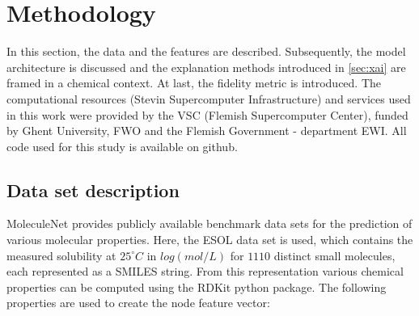 \chapter{Methodology}


In this section, the data and the features are described. 
Subsequently, the model architecture is discussed and the explanation methods 
introduced in \cref{sec:xai} are framed in a chemical context. At last, 
the fidelity metric is introduced. The computational resources (Stevin Supercomputer 
Infrastructure) and services used in this work were provided by the VSC (Flemish 
Supercomputer Center), funded by Ghent University, FWO and the Flemish Government 
- department EWI. All code used for this study is available on github\cite{gitrepo}.


\section{Data set description}


MoleculeNet provides publicly available benchmark data sets for the prediction of 
various molecular properties.\cite{wu2018moleculenet} Here, the ESOL data set is used,
which contains the measured solubility at $25^{\circ} C$ in $log(mol/L)$ for $1110$ 
distinct small molecules, each represented as a SMILES string.\cite{delaney2004esol}
From this representation various chemical properties can be computed using the RDKit python package\cite{landrum2010r}. 
The following properties are used to create the node feature vector: \cite{wu2023chemistry}

